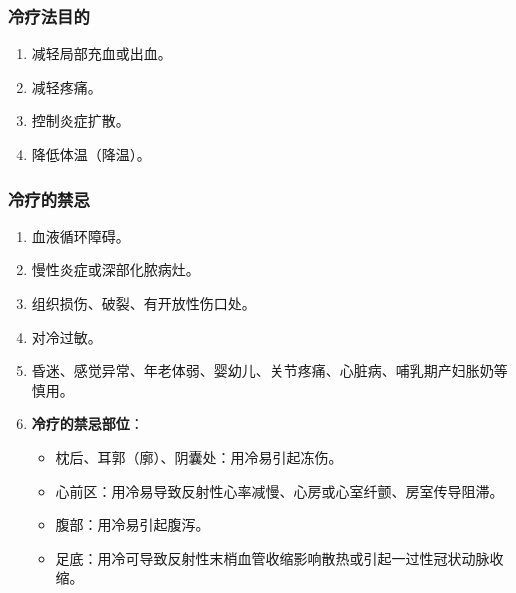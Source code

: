 \documentclass[11pt, a4paper]{ctexart}
\begin{document}
\subsubsection{冷疗法目的}
\begin{enumerate}
	\item 减轻局部充血或出血。
	\item 减轻疼痛。
	\item 控制炎症扩散。
	\item 降低体温（降温）。
\end{enumerate}

\subsubsection{冷疗的禁忌}
\begin{enumerate}
	\item 血液循环障碍。
	\item 慢性炎症或深部化脓病灶。
	\item 组织损伤、破裂、有开放性伤口处。
	\item 对冷过敏。
	\item 昏迷、感觉异常、年老体弱、婴幼儿、关节疼痛、心脏病、哺乳期产妇胀奶等慎用。
	\item \textbf{冷疗的禁忌部位}：
	      \begin{itemize}
		      \item 枕后、耳郭（廓）、阴囊处：用冷易引起冻伤。
		      \item 心前区：用冷易导致反射性心率减慢、心房或心室纤颤、房室传导阻滞。
		      \item 腹部：用冷易引起腹泻。
		      \item 足底：用冷可导致反射性末梢血管收缩影响散热或引起一过性冠状动脉收缩。
	      \end{itemize}
\end{enumerate}
\end{document}
